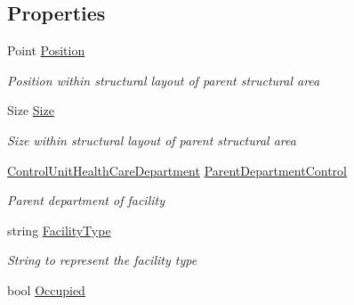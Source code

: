 \subsection*{Properties}
\begin{DoxyCompactItemize}
\item 
Point \hyperlink{class_general_health_care_elements_1_1_entities_1_1_entity_treatment_facility_ab4d70f5b558d7a411734dfd5febf812b}{Position}
\begin{DoxyCompactList}\small\item\em Position within structural layout of parent structural area \end{DoxyCompactList}\item 
Size \hyperlink{class_general_health_care_elements_1_1_entities_1_1_entity_treatment_facility_a6f9e7fc7343f99d15f9bd18667dff61f}{Size}
\begin{DoxyCompactList}\small\item\em Size within structural layout of parent structural area \end{DoxyCompactList}\item 
\hyperlink{class_general_health_care_elements_1_1_control_units_1_1_control_unit_health_care_department}{Control\+Unit\+Health\+Care\+Department} \hyperlink{class_general_health_care_elements_1_1_entities_1_1_entity_treatment_facility_a52576742da857060465cfb050cb0d30e}{Parent\+Department\+Control}
\begin{DoxyCompactList}\small\item\em Parent department of facility \end{DoxyCompactList}\item 
string \hyperlink{class_general_health_care_elements_1_1_entities_1_1_entity_treatment_facility_a67893fdf23350cb371a58f8e4ec9162a}{Facility\+Type}
\begin{DoxyCompactList}\small\item\em String to represent the facility type \end{DoxyCompactList}\item 
bool \hyperlink{class_general_health_care_elements_1_1_entities_1_1_entity_treatment_facility_ac089914fbf7bde2638c7b582d8e9c178}{Occupied}

\end{DoxyCompactItemize}
